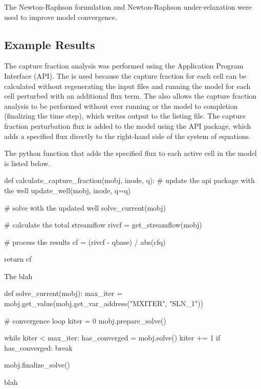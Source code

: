 The Newton-Raphson formulation and Newton-Raphson under-relaxation were used to improve model convergence.


\subsection{Example Results}

The capture fraction analysis was performed using the \MF Application Program Interface (API). The \mfapi is used because the capture fraction for each cell can be calculated without regenerating the input files and running the model for each cell perturbed with an additional flux term. The \mfapi also allows the capture fraction analysis to be performed without ever running or the model to completion (finalizing the time step), which writes output to the listing file. The capture fraction perturbation flux is added to the model using the API package, which adds a specified flux directly to the right-hand side of the system of equations.

The python function that adds the specified flux to each active cell in the model is listed below.

\begin{python}
def calculate_capture_fraction(mobj, inode, q):
  # update the api package with the well
  update_well(mobj, inode, q=q)

  # solve with the updated well
  solve_current(mobj)

  # calculate the total streamflow
  rivcf = get_streamflow(mobj)

  # process the results
  cf = (rivcf - qbase) / abs(cfq)
	
  return cf
\end{python}

\noindent The blah 

\begin{python}
def solve_current(mobj):
    max_iter = mobj.get_value(mobj.get_var_address("MXITER", "SLN_1"))

    # convergence loop
    kiter = 0
    mobj.prepare_solve()

    while kiter < max_iter:
        has_converged = mobj.solve()
        kiter += 1
        if has_converged:
            break

    mobj.finalize_solve()
\end{python}

blah 

\begin{python}
\end{python}


